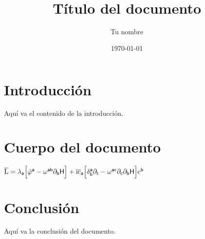 \documentclass{article}
\title{Título del documento}
\author{Tu nombre}
\date{\today}
\begin{document}
\maketitle

\section{Introducción}

Aquí va el contenido de la introducción.

\section{Cuerpo del documento}

$\overline{\rm L}=\lambda_{\sf a}\Big[\dot{\varphi}^{\sf a}-\omega^{\sf ab} \partial_{\sf b}{\sf H}\Big]+\rm i\overline{\rm c}_{\sf a}\Big[\delta^{ \sf a}_{\sf b}\partial_{t}-\omega^{\sf ac}\partial_{\sf c}\partial_{\sf b}{ \sf H}\Big] c^{\sf b}$

\section{Conclusión}

Aquí va la conclusión del documento.
\end{document}
